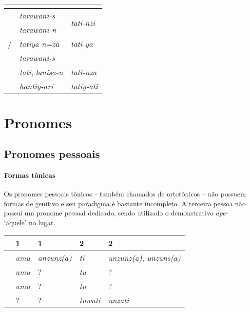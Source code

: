 \begin{center}
	\begin{tabular}[c]{lll}
		\toprule
		                      & \Sg{}\emph{}                 & \Pl{}\emph{}                       \\
		\midrule
		\Nom{} \Com{}         & \emph{tarawani-s}            & \multirow{2}{4em}{\emph{tati-nzi}} \\
		\Acu{} \Com{}         & \emph{tarawani-n}            &                                    \\
		\Nom{}/\Acu{} \Neut{} & \emph{tatiya-n=za}           & \emph{tati-ya}                     \\
		\Gen{}                & \emph{tarawani-s}            &                                    \\
		\Dat{}                & \emph{tati}, \emph{lanisa-n} & \emph{tati-nza}                    \\
		\Abl{}                & \emph{hantiy-ari}            & \emph{tatiy-ati}                   \\
		\bottomrule
	\end{tabular}
\end{center}


\section{Pronomes}

\subsection{Pronomes pessoais}

\paragraph{Formas tônicas}
Os pronomes pessoais tônicos -- também chamados de
ortotônicos -- não possuem formas de genitivo e seu paradigma é bastante
incompleto. A terceira pessoa não possui um pronome pessoal dedicado, sendo
utilizado o demonstrativo \emph{apa-} `aquele' no lugar.


\begin{center}
	\begin{tabular}[c]{lll|ll}
		\toprule
		       & 1\Sg{}\emph{} & 1\Pl{}\emph{}      & 2\Sg{}\emph{} & 2\Pl{}\emph{}                          \\
		\midrule
		\Nom{} & \emph{amu}    & \emph{anzunz{(a)}} & \emph{ti}     & \emph{unzunz{(a)}}, \emph{unzuns{(a)}} \\
		\Acu{} & \emph{amu}    & {?}\emph{}         & \emph{tu}     & {?}\emph{}                             \\
		\Dat{} & \emph{amu}    & {?}\emph{}         & \emph{tu}     & {?}\emph{}                             \\
		\Abl{} & {?}\emph{}    & {?}\emph{}         & \emph{tuwati} & \emph{unzati}                          \\
		\bottomrule
	\end{tabular}
\end{center}

